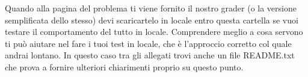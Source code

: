\documentclass[a4paper,11pt]{article}
\begin{document}
  Quando alla pagina del problema ti viene fornito il nostro grader (o la versione semplificata dello stesso) devi scaricartelo in locale entro questa cartella
  se vuoi testare il comportamento del tutto in locale. Comprendere meglio a cosa servono ti può aiutare nel fare i tuoi test in locale, che è l'approccio corretto col quale andrai lontano. In questo caso tra gli allegati trovi anche un file README.txt che prova a fornire ulteriori chiarimenti proprio su questo punto.
  
  
\end{document}
